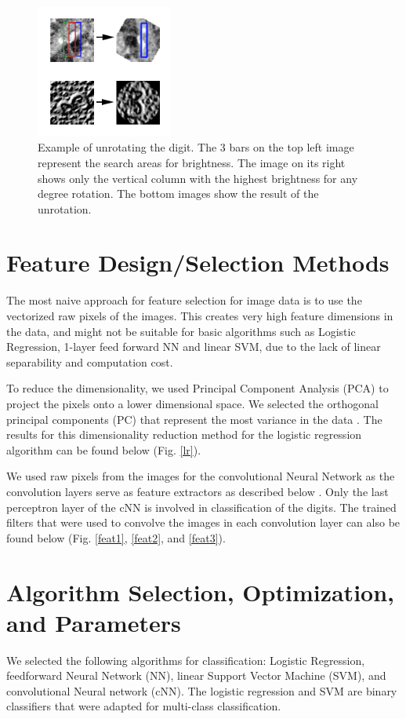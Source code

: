 \documentclass[conference]{IEEEtran}
\begin{document}
\begin{figure}[H]
\centering
\includegraphics[width=0.4\textwidth]{rotate.png}
\caption{\scriptsize Example of unrotating the digit. The 3 bars on the top left image represent the search areas for brightness. The image on its right shows only the vertical column with the highest brightness for any degree rotation. The bottom images show the result of the unrotation.}
\label{rotate}
\end{figure}

\section{Feature Design/Selection Methods}
The most naive approach for feature selection for image data is to use the vectorized raw pixels of the images. This creates very high feature dimensions in the data, and might not be suitable for basic algorithms such as Logistic Regression, 1-layer feed forward NN and linear SVM, due to the lack of linear separability and computation cost.

To reduce the dimensionality, we used Principal Component Analysis (PCA) to project the pixels onto a lower dimensional space. We selected the orthogonal principal components (PC) that represent the most variance in the data \cite{bishop2006pattern}. The results for this dimensionality reduction method for the logistic regression algorithm can be found below (Fig. \ref{lr}).

We used raw pixels from the images for the convolutional Neural Network as the convolution layers serve as feature extractors as described below \cite{lecun-98}. Only the last perceptron layer of the cNN is involved in classification of the digits. The trained filters that were used to convolve the images in each convolution layer can also be found below (Fig. \ref{feat1}, \ref{feat2}, and \ref{feat3}). 

\section{Algorithm Selection, Optimization, and Parameters}
We selected the following algorithms for classification: Logistic Regression, feedforward Neural Network (NN), linear Support Vector Machine (SVM), and convolutional Neural network (cNN). The logistic regression and SVM are binary classifiers that were adapted for multi-class classification.
\end{document}
